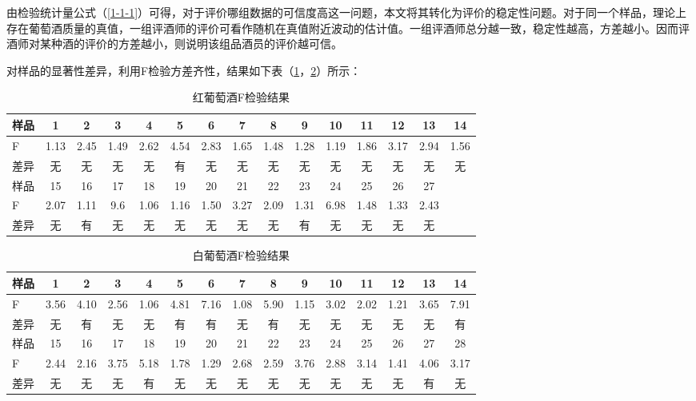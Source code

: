\documentclass[withoutpreface,bwprint]{cumcmthesis} %
\begin{document}
由检验统计量公式（\ref{1-1-1}）可得，对于评价哪组数据的可信度高这一问题，本文将其转化为评价的稳定性问题。对于同一个样品，理论上存在葡萄酒质量的真值，一组评酒师的评价可看作随机在真值附近波动的估计值。一组评酒师总分越一致，稳定性越高，方差越小。因而评酒师对某种酒的评价的方差越小，则说明该组品酒员的评价越可信。

对样品的显著性差异，利用F检验方差齐性，结果如下表（\ref{红葡萄酒F检验结果}，\ref{白葡萄酒F检验结果}）所示：

\begin{table}[!htbp]
\centering
\caption{红葡萄酒F检验结果}
\label{红葡萄酒F检验结果}
\begin{tabular}{lcccccccccccccc}
\toprule
样品	& 1 & 2 & 3 & 4 & 5 & 6 & 7 & 8 & 9 & 10 & 11 & 12 & 13 & 14\\
\midrule
F & 1.13 &2.45 &1.49 &2.62 &4.54 &2.83 &1.65 &1.48 &1.28 &1.19 &1.86 &3.17 &2.94 &1.56\\
差异 & 无 &无 &无 &无 &有 &无 &无 &无 &无 &无 &无 &无 &无 &无\\
\midrule
样品	  & 15 & 16 & 17 & 18 & 19 & 20 & 21 & 22 & 23 & 24 & 25 & 26 & 27 & \\
\midrule
F   &2.07 &1.11 &9.6 &1.06 &1.16 &1.50 &3.27 &2.09& 1.31 &6.98 &1.48 &1.33 &2.43 &\\
差异   &无 &有 &无 &无 &无 &无 & 无 &无 &有 &无 &无 &无 &无&\\
\bottomrule 
\end{tabular}
\end{table}

\begin{table}[!htbp]
\centering
\caption{白葡萄酒F检验结果}
\label{白葡萄酒F检验结果}
\begin{tabular}{lcccccccccccccc}
\toprule
样品	& 1 & 2 & 3 & 4 & 5 & 6 & 7 & 8 & 9 & 10 & 11 & 12 & 13 & 14\\
\midrule
F & 3.56 & 4.10 &2.56 &1.06 &4.81 &7.16 &1.08 & 5.90 &1.15 &3.02 &2.02 &1.21 &3.65 &7.91\\
差异 & 无 &有 &无 &无 &有 &有 &无 & 有 &无 &无 &无 &无 &无 &有\\
\midrule
样品	  & 15 & 16 & 17 & 18 & 19 & 20 & 21 & 22 & 23 & 24 & 25 & 26 & 27 & 28\\
\midrule
F   & 2.44 &2.16 &3.75 &5.18 &1.78 &1.29 &2.68 & 2.59 &3.76 &2.88 &3.14 &1.41 &4.06 &3.17\\
差异   & 无 &无 &无 &有 &无 &无 &无 & 无 &无 &无 &无 &无 &有 &无\\
\bottomrule 
\end{tabular}
\end{table}
\end{document}
